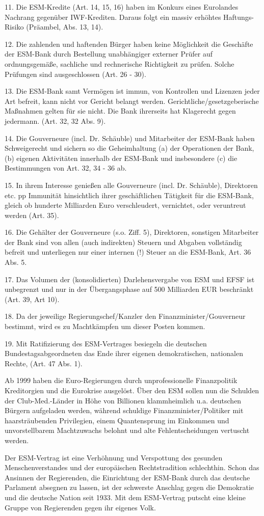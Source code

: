 {11. Die ESM-Kredite (Art. 14, 15, 16) haben im Konkurs eines Eurolandes Nachrang gegenüber IWF-Krediten. Daraus folgt ein massiv erhöhtes Haftungs-Risiko (Präambel, Abs. 13, 14).

12. Die zahlenden und haftenden Bürger haben keine Möglichkeit die Geschäfte der ESM-Bank durch Bestellung unabhängiger externer Prüfer auf ordnungsgemäße, sachliche und rechnerische Richtigkeit zu prüfen. Solche Prüfungen sind ausgeschlossen (Art. 26 - 30).

13. Die ESM-Bank samt Vermögen ist immun, von Kontrollen und Lizenzen jeder Art befreit, kann nicht vor Gericht belangt werden. Gerichtliche/gesetzgeberische Maßnahmen gelten für sie nicht. Die Bank ihrerseits hat Klagerecht gegen jedermann. (Art. 32, 32 Abs. 9).

14. Die Gouverneure (incl. Dr. Schäuble) und Mitarbeiter der ESM-Bank haben Schweigerecht und sichern so die Geheimhaltung (a) der Operationen der Bank, (b) eigenen Aktivitäten innerhalb der ESM-Bank und insbesondere (c) die Bestimmungen von Art. 32, 34 - 36 ab.

15. In ihrem Interesse genießen alle Gouverneure (incl. Dr. Schäuble), Direktoren etc. pp Immunität hinsichtlich ihrer geschäftlichen Tätigkeit für die ESM-Bank, gleich ob hunderte Milliarden Euro verschleudert, vernichtet, oder veruntreut werden (Art. 35).

16. Die Gehälter der Gouverneure (s.o. Ziff. 5), Direktoren, sonstigen Mitarbeiter der Bank sind von allen (auch indirekten) Steuern und Abgaben vollständig befreit und unterliegen nur einer internen (!) Steuer an die ESM-Bank, Art. 36 Abs. 5.

17. Das Volumen der (konsolidierten) Darlehensvergabe von ESM und EFSF ist unbegrenzt und nur in der Übergangsphase auf 500 Milliarden EUR beschränkt (Art. 39, Art 10).

18. Da der jeweilige Regierungschef/Kanzler den Finanzminister/Gouverneur bestimmt, wird es zu Machtkämpfen um dieser Posten kommen.

19. Mit Ratifizierung des ESM-Vertrages besiegeln die deutschen Bundestagsabgeordneten das Ende ihrer eigenen demokratischen, nationalen Rechte, (Art. 47 Abs. 1).


Ab 1999 haben die Euro-Regierungen durch unprofessionelle Finanzpolitik Kreditorgien und die Eurokrise ausgelöst. Über den ESM sollen nun die Schulden der {\Gu}Club-Med.-Länder{\Go} in Höhe von Billionen klammheimlich u.a. deutschen Bürgern aufgeladen werden, während schuldige Finanzminister/Politiker mit haarsträubenden Privilegien, einem Quantensprung im Einkommen und unvorstellbarem Machtzuwachs belohnt und alte Fehlentscheidungen vertuscht werden.

Der ESM-Vertrag ist eine Verhöhnung und Verspottung des gesunden Menschenverstandes und der europäischen Rechtstradition schlechthin. Schon das Ansinnen der Regierenden, die Einrichtung der ESM-Bank durch das deutsche Parlament absegnen zu lassen, ist der schwerste Anschlag gegen die Demokratie und die deutsche Nation seit 1933. Mit dem ESM-Vertrag putscht eine kleine Gruppe von Regierenden gegen ihr eigenes Volk.}

